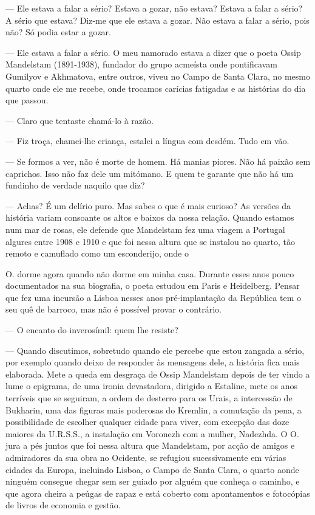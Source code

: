 --- Ele estava a falar a sério? Estava a gozar, não estava? Estava a falar
  a sério? A sério que estava? Diz-me que ele estava a gozar. Não estava
  a falar a sério, pois não? Só podia estar a gozar.

--- Ele estava a falar a sério. O meu namorado estava a dizer que o poeta
  Ossip Mandelstam (1891-1938), fundador do grupo acmeísta onde
  pontificavam Gumilyov e Akhmatova, entre outros, viveu no Campo de
  Santa Clara, no mesmo quarto onde ele me recebe, onde trocamos
  carícias fatigadas e as histórias do dia que passou.

--- Claro que tentaste chamá-lo à razão.

--- Fiz troça, chamei-lhe criança, estalei a língua com desdém. Tudo em
  vão.

--- Se formos a ver, não é morte de homem. Há manias piores. Não há paixão
  sem caprichos. Isso não faz dele um mitómano. E quem te garante que
  não há um fundinho de verdade naquilo que diz?

--- Achas? É um delírio puro. Mas sabes o que é mais
curioso? As versões da história variam consoante os altos e baixos da
nossa relação. Quando estamos num mar de rosas, ele defende que
Mandelstam fez uma viagem a Portugal algures entre 1908 e 1910 e que foi
nessa altura que se instalou no quarto, tão remoto e camuflado como um
esconderijo, onde o

O. dorme agora quando não dorme em minha casa. Durante esses anos pouco
documentados na sua biografia, o poeta estudou em Paris e Heidelberg.
Pensar que fez uma incursão a Lisboa nesses anos pré-implantação da
República tem o seu quê de barroco, mas não é possível provar o
contrário.

--- O encanto do inverosímil: quem lhe resiste?

--- Quando discutimos, sobretudo quando ele percebe que estou zangada a
  sério, por exemplo quando deixo de responder às mensagens dele, a
  história fica mais elaborada. Mete a queda em desgraça de Ossip
  Mandelstam depois de ter vindo a lume o epigrama, de uma ironia
  devastadora, dirigido a Estaline, mete os anos terríveis que se
  seguiram, a ordem de desterro para os Urais, a intercessão de
  Bukharin, uma das figuras mais poderosas do Kremlin, a comutação da
  pena, a possibilidade de escolher qualquer cidade para viver, com
  excepção das doze maiores da U.R.S.S., a instalação em Voronezh com a
  mulher, Nadezhda. O O. jura a pés juntos que foi nessa altura que
  Mandelstam, por acção de amigos e admiradores da sua obra no Ocidente,
  se refugiou sucessivamente em várias cidades da Europa, incluindo
  Lisboa, o Campo de Santa Clara, o quarto aonde ninguém consegue chegar
  sem ser guiado por alguém que conheça o caminho, e que agora cheira a
  peúgas de rapaz e está coberto com apontamentos e fotocópias de livros
  de economia e gestão.

